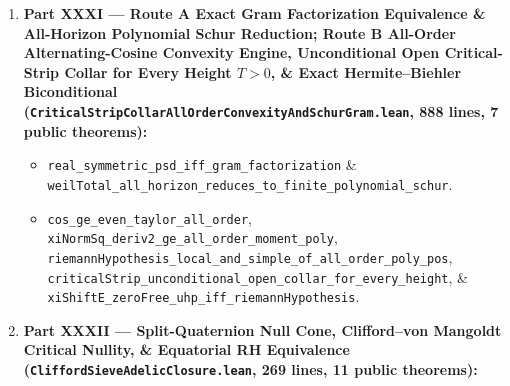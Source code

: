 \documentclass[
  11pt,
]{article}
\providecommand{\tightlist}{%
  \setlength{\itemsep}{0pt}\setlength{\parskip}{0pt}}
\begin{document}
\begin{enumerate}
  \begin{itemize}
  \tightlist
  \item
    \texttt{weilTotal\_all\_horizon\_finiteCodim\_coercive},
    \texttt{weilTotal\_all\_horizon\_finite\_negative\_obstruction}, \&
    \texttt{hilbert\_schur\_complement\_positivity\_reduction}.
  \item
    \texttt{norm\_complex\_Gamma\_ge\_pi\_div\_two\_exp\_neg\_pi\_abs\_im},
    \texttt{norm\_riemannZeta\_ge\_const\_of\_one\_lt\_re},
    \texttt{norm\_riemannXi\_le\_uniform\_vertical\_strip},
    \texttt{norm\_riemannXi\_ge\_exp\_neg\_pi\_half\_of\_one\_lt\_re},
    \texttt{xiSchur\_strict\_contraction\_and\_hopfBloch\_complete\_outer\_halfPlane},
    \texttt{holomorphic\_annulus\_hopf\_boundary\_lemma},
    \texttt{schur\_boundary\_phase\_velocity\_pos}, \&
    \texttt{xiResolvent\_herglotz\_global\_complete\_outer\_halfPlane\_half}.
  \end{itemize}
\item
  \textbf{Part XXXI --- Route A Exact Gram Factorization Equivalence \&
  All-Horizon Polynomial Schur Reduction; Route B All-Order
  Alternating-Cosine Convexity Engine, Unconditional Open Critical-Strip
  Collar for Every Height \(T > 0\), \& Exact Hermite--Biehler
  Biconditional
  (\texttt{CriticalStripCollarAllOrderConvexityAndSchurGram.lean}, 888
  lines, 7 public theorems):}

  \begin{itemize}
  \tightlist
  \item
    \texttt{real\_symmetric\_psd\_iff\_gram\_factorization} \&
    \texttt{weilTotal\_all\_horizon\_reduces\_to\_finite\_polynomial\_schur}.
  \item
    \texttt{cos\_ge\_even\_taylor\_all\_order},
    \texttt{xiNormSq\_deriv2\_ge\_all\_order\_moment\_poly},
    \texttt{riemannHypothesis\_local\_and\_simple\_of\_all\_order\_poly\_pos},
    \texttt{criticalStrip\_unconditional\_open\_collar\_for\_every\_height},
    \& \texttt{xiShiftE\_zeroFree\_uhp\_iff\_riemannHypothesis}.
  \end{itemize}
\item
  \textbf{Part XXXII --- Split-Quaternion Null Cone, Clifford--von
  Mangoldt Critical Nullity, \& Equatorial RH Equivalence
  (\texttt{CliffordSieveAdelicClosure.lean}, 269 lines, 11 public
  theorems):}


\end{enumerate}
\end{document}
